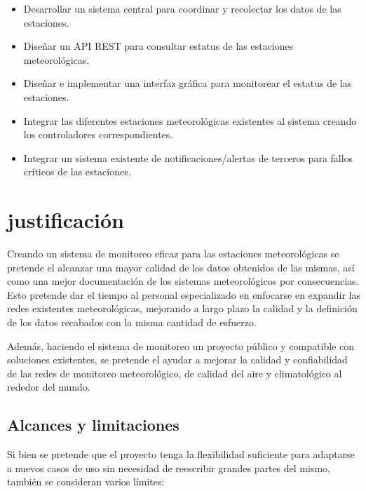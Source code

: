 \begin{itemize}

   \item Desarrollar un sistema central para coordinar y recolectar los datos de las estaciones.

   \item Diseñar un API REST para consultar estatus de las estaciones meteorológicas.

   \item Diseñar e implementar una interfaz gráfica para monitorear el estatus de las estaciones.

   \item Integrar las diferentes estaciones meteorológicas existentes al sistema creando los controladores correspondientes.

   \item Integrar un sistema existente de notificaciones/alertas de terceros para fallos críticos de las estaciones.
\end{itemize}

\section{justificación}

Creando un sistema de monitoreo eficaz para las estaciones meteorológicas se pretende el alcanzar una mayor calidad de los datos obtenidos de las mismas, así como una mejor documentación de los sistemas meteorológicos por consecuencias. Esto pretende dar el tiempo al personal especializado en enfocarse en expandir las redes existentes meteorológicas, mejorando a largo plazo la calidad y la definición de los datos recabados con la misma cantidad de esfuerzo.

Además, haciendo el sistema de monitoreo un proyecto público y compatible con soluciones existentes, se pretende el ayudar a mejorar la calidad y confiabilidad de las redes de monitoreo meteorológico, de calidad del aire y climatológico al rededor del mundo.

\subsection{Alcances y limitaciones}

Si bien se pretende que el proyecto tenga la flexibilidad suficiente para adaptarse a nuevos casos de uso sin necesidad de reescribir grandes partes del mismo, también se consideran varios límites:

